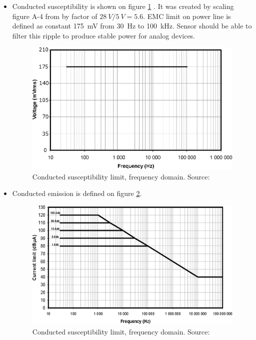 	\begin{itemize}
		\item Conducted susceptibility is shown on figure \ref{EMC_conducted_susceptibility} . It was created by scaling figure A-4 from \cite{ECSS_E_ST_20_07C} by factor of $\SI{28}{V}/\SI{5}{V} = 5.6$. EMC limit on power line is defined as constant \SI{175}{mV} from \SI{30}{Hz} to \SI{100}{kHz}. Sensor should be able to filter this ripple to produce stable power for analog devices.
		
		\begin{figure}[H]
			\centering
			\includegraphics[width=0.5\paperwidth]{img/EMC_conducted_susceptibility.eps}
			\caption{Conducted susceptibility limit, frequency domain. Source: \cite{ECSS_E_ST_20_07C}}
			\label{EMC_conducted_susceptibility}
		\end{figure}
	
	
		\item Conducted emission is defined on figure \ref{EMC_conducted_emission}.
		
		\begin{figure}[H]
			\centering
			\includegraphics[width=0.5\paperwidth]{img/EMC_conducted_emission.eps}
			\caption{Conducted susceptibility limit, frequency domain. Source: \cite{ECSS_E_ST_20_07C}}
			\label{EMC_conducted_emission}
		\end{figure}	



\end{itemize}
